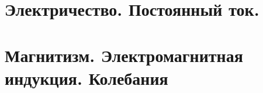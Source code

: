 \documentclass[a4paper,12pt]{article}
\begin{document}
\tableofcontents

\newpage
\pagestyle{fancy}

\section{Электричество. Постоянный ток.}






\section{Магнитизм. Электромагнитная индукция. Колебания}







\end{document}
